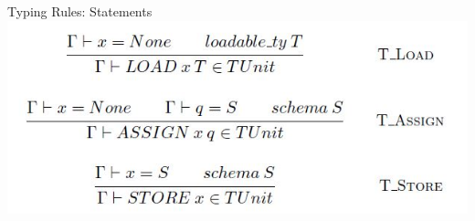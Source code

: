 \begin{frame}{Typing Rules: Statements}
\centering
\includegraphics[scale=0.4]{Images/TypingRules/Load_Assign_Store.JPG} 
\end{frame}

